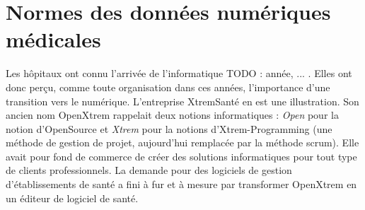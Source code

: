 

\newpage


\section{Normes des données numériques médicales}

Les hôpitaux ont connu l'arrivée de l'informatique TODO : année, ... . Elles ont donc perçu, comme toute organisation dans ces années, l'importance d'une transition vers le numérique. L'entreprise XtremSanté en est une illustration. Son ancien nom OpenXtrem rappelait deux notions informatiques : \textit{Open} pour la notion d'\gls{OpenSource} et \textit{Xtrem} pour la notions d'Xtrem-Programming (une méthode de gestion de projet, aujourd'hui remplacée par la méthode \gls{scrum}). Elle avait pour fond de commerce de créer des solutions informatiques pour tout type de clients professionnels.
La demande pour des logiciels de gestion d'établissements de santé a fini à fur et à mesure par transformer OpenXtrem en un éditeur de logiciel de santé.
